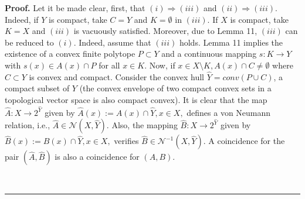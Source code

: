 \documentclass{article}
\newenvironment{proof}[1][Proof]{\noindent\textbf{#1.} }{\ \rule{0.5em}{0.5em}}
\begin{document}
\begin{proof}
Let it be made clear, first, that $(i)\Longrightarrow (iii)$ and $%
(ii)\Longrightarrow (iii).$ Indeed, if $Y$ is compact, take $C=Y$ and $%
K=\emptyset $ in $(iii).$ If $X$ is compact, take $K=X$ and $(iii)$ is
vacuously satisfied. Moreover, due to Lemma 11, $(iii)$ can be reduced to $%
(i)$. Indeed, assume that $(iii)$ holds. Lemma 11 implies the existence of a
convex finite polytope $P\subset Y$ and a continuous mapping $%
s:K\longrightarrow Y$ with $s(x)\in A(x)\cap P$ for all $x\in K.$ Now, if $%
x\in X\setminus K,A(x)\cap C\neq \emptyset $ where $C\subset Y$ is convex
and compact$.$ Consider the convex hull $\hat{Y}=conv(P\cup C)$, a compact
subset of $Y$ (the convex envelope of two compact convex sets in a
topological vector space is also compact convex). It is clear that the map $%
\hat{A}:X\longrightarrow 2^{\hat{Y}}$ given by $\hat{A}(x):=A(x)\cap \hat{Y}%
,x\in X,$ defines a von Neumann relation, i.e., $\hat{A}\in \mathcal{N}(X,%
\hat{Y}).$ Also, the mapping $\hat{B}:X\longrightarrow 2^{\hat{Y}}$ given by 
$\hat{B}(x):=B(x)\cap \hat{Y},x\in X,$ verifies $\hat{B}\in \mathcal{N}%
^{-1}(X,\hat{Y}).$ A coincidence for the pair $(\hat{A},\hat{B})$ is also a
coincidence for $(A,B).$


\end{proof}
\end{document}
